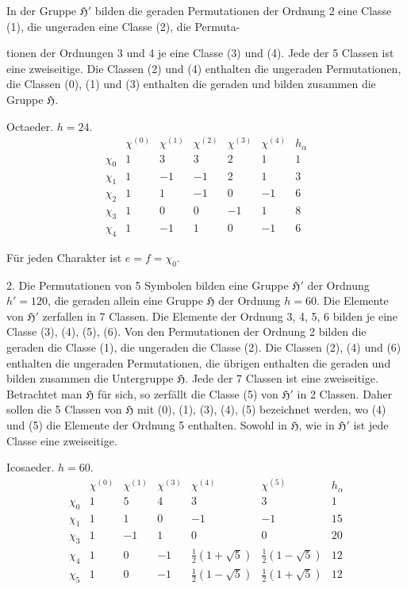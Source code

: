 \documentclass[11pt]{article}
\newcommand{\grp}{\mathfrak{H}}
\begin{document}
In der Gruppe $\grp'$ bilden die geraden Permutationen der Ordnung 2 eine Classe (1), die ungeraden eine Classe (2), die Permuta-

tionen der Ordnungen 3 und 4 je eine Classe (3) und (4). Jede der 5 Classen ist eine zweiseitige. Die Classen (2) und (4) enthalten die ungeraden Permutationen, die Classen (0), (1) und (3) enthalten die geraden und bilden zusammen die Gruppe $\grp$.

\begin{center}
Octaeder. $h=24$.
\[
\begin{array}{c|rrrrr|r}
 & \chi^{(0)} & \chi^{(1)} & \chi^{(2)} & \chi^{(3)} & \chi^{(4)} & h_\alpha\\ \hline
\chi_0 & 1 & 3 & 3 & 2 & 1 & 1\\
\chi_1 & 1 & -1 & -1 & 2 & 1 & 3\\
\chi_2 & 1 & 1 & -1 & 0 & -1 & 6\\
\chi_3 & 1 & 0 & 0 & -1 & 1 & 8\\
\chi_4 & 1 & -1 & 1 & 0 & -1 & 6
\end{array}
\]
\end{center}

Für jeden Charakter ist $e=f=\chi_0$.

2. Die Permutationen von 5 Symbolen bilden eine Gruppe $\grp'$ der Ordnung $h'=120$, die geraden allein eine Gruppe $\grp$ der Ordnung $h=60$. Die Elemente von $\grp'$ zerfallen in 7 Classen. Die Elemente der Ordnung 3, 4, 5, 6 bilden je eine Classe (3), (4), (5), (6). Von den Permutationen der Ordnung 2 bilden die geraden die Classe (1), die ungeraden die Classe (2). Die Classen (2), (4) und (6) enthalten die ungeraden Permutationen, die übrigen enthalten die geraden und bilden zusammen die Untergruppe $\grp$. Jede der 7 Classen ist eine zweiseitige. Betrachtet man $\grp$ für sich, so zerfällt die Classe (5) von $\grp'$ in 2 Classen. Daher sollen die 5 Classen von $\grp$ mit (0), (1), (3), (4), (5) bezeichnet werden, wo (4) und (5) die Elemente der Ordnung 5 enthalten. Sowohl in $\grp$, wie in $\grp'$ ist jede Classe eine zweiseitige.

\begin{center}
Icosaeder. $h=60$.
\[
\begin{array}{c|rrrrr|r}
 & \chi^{(0)} & \chi^{(1)} & \chi^{(3)} & \chi^{(4)} & \chi^{(5)} & h_\alpha\\ \hline
\chi_0 & 1 & 5 & 4 & 3 & 3 & 1\\
\chi_1 & 1 & 1 & 0 & -1 & -1 & 15\\
\chi_3 & 1 & -1 & 1 & 0 & 0 & 20\\
\chi_4 & 1 & 0 & -1 & \frac{1}{2}(1+\sqrt{5}) & \frac{1}{2}(1-\sqrt{5}) & 12\\
\chi_5 & 1 & 0 & -1 & \frac{1}{2}(1-\sqrt{5}) & \frac{1}{2}(1+\sqrt{5}) & 12
\end{array}
\]
\end{center}
\end{document}
